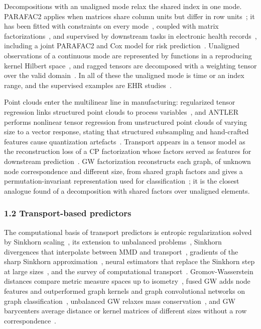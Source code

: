 \documentclass[journal,onecolumn]{IEEEtran}
\begin{document}
Decompositions with an unaligned mode relax the shared index in one mode. PARAFAC2 applies when matrices share column units but differ in row units~\cite{Kiers1999PARAFAC2}; it has been fitted with constraints on every mode~\cite{Roald2022AOADMM}, coupled with matrix factorizations~\cite{Schenker2025PARAFAC2CMTF}, and supervised by downstream tasks in electronic health records~\cite{Ren2023MULTIPAR,Konyar2025SemiSupervised}, including a joint PARAFAC2 and Cox model for risk prediction~\cite{Patalano2026PAR2COX}. Unaligned observations of a continuous mode are represented by functions in a reproducing kernel Hilbert space~\cite{Tang2026Unaligned}, and ragged tensors are decomposed with a weighting tensor over the valid domain~\cite{Hu2026Ragged}. In all of these the unaligned mode is time or an index range, and the supervised examples are EHR studies~\cite{Ren2023MULTIPAR,Konyar2025SemiSupervised,Patalano2026PAR2COX}.

Point clouds enter the multilinear line in manufacturing: regularized tensor regression links structured point clouds to process variables~\cite{Yan2019Structured}, and ANTLER performs nonlinear tensor regression from unstructured point clouds of varying size to a vector response, stating that structured subsampling and hand-crafted features cause quantization artefacts~\cite{Biehler2024ANTLER}. Transport appears in a tensor model as the reconstruction loss of a CP factorization whose factors served as features for downstream prediction~\cite{Afshar2021SWIFT}. GW factorization reconstructs each graph, of unknown node correspondence and different size, from shared graph factors and gives a permutation-invariant representation used for classification~\cite{Xu2023Representing}; it is the closest analogue found of a decomposition with shared factors over unaligned elements.

\subsubsection{1.2 Transport-based predictors}

The computational basis of transport predictors is entropic regularization solved by Sinkhorn scaling~\cite{Cuturi2013Sinkhorn}, its extension to unbalanced problems~\cite{Chizat2018Scaling}, Sinkhorn divergences that interpolate between MMD and transport~\cite{Feydy2019Interpolating}, gradients of the sharp Sinkhorn approximation~\cite{Luise2018Differential}, neural estimators that replace the Sinkhorn step at large sizes~\cite{Wang2026NeuralEntropic}, and the survey of computational transport~\cite{Peyre2019Computational}. Gromov-Wasserstein distances compare metric measure spaces up to isometry~\cite{Memoli2011GromovWasserstein}, fused GW adds node features and outperformed graph kernels and graph convolutional networks on graph classification~\cite{Vayer2019Structured}, unbalanced GW relaxes mass conservation~\cite{Sejourne2021Unbalanced}, and GW barycenters average distance or kernel matrices of different sizes without a row correspondence~\cite{Peyre2016Gromov}.
\end{document}

